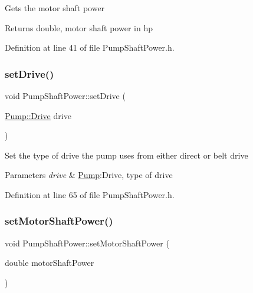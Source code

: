 Gets the motor shaft power \begin{DoxyReturn}{Returns}
double, motor shaft power in hp 
\end{DoxyReturn}


Definition at line 41 of file Pump\+Shaft\+Power.\+h.

\mbox{\label{class_pump_shaft_power_a2c35a110c65c582a6f7d1d4c714f8187}} 
\subsubsection{\texorpdfstring{set\+Drive()}{setDrive()}}
{\footnotesize\ttfamily void Pump\+Shaft\+Power\+::set\+Drive (\begin{DoxyParamCaption}\item[{\hyperlink{class_pump_a32bf0ade131a11bb3b3fb374f638e983}{Pump\+::\+Drive}}]{drive }\end{DoxyParamCaption})\hspace{0.3cm}{\ttfamily [inline]}}

Set the type of drive the pump uses from either direct or belt drive 
\begin{DoxyParams}{Parameters}
{\em drive} & \hyperlink{class_pump}{Pump}\+:Drive, type of drive \\
\hline
\end{DoxyParams}


Definition at line 65 of file Pump\+Shaft\+Power.\+h.

\mbox{\label{class_pump_shaft_power_a77b8c621c7c92841dbd00112437c413b}} 
\subsubsection{\texorpdfstring{set\+Motor\+Shaft\+Power()}{setMotorShaftPower()}}
{\footnotesize\ttfamily void Pump\+Shaft\+Power\+::set\+Motor\+Shaft\+Power (\begin{DoxyParamCaption}\item[{double}]{motor\+Shaft\+Power }\end{DoxyParamCaption})\hspace{0.3cm}{\ttfamily [inline]}}

